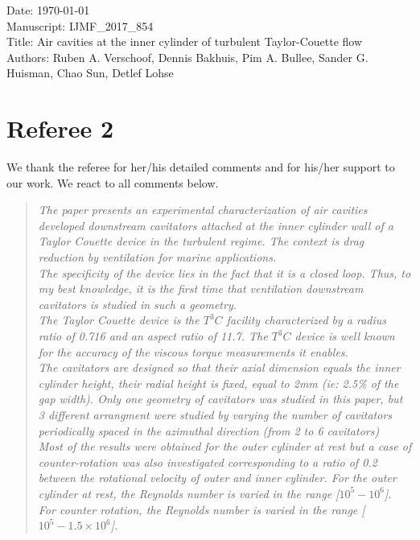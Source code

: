 \documentclass[10pt]{article}
\newcommand{\question}[1]{\begin{quote} \emph{#1}  \end{quote} }
\begin{document}
\noindent Date: \today \\
Manuscript: IJMF\_2017\_854\\
Title: Air cavities at the inner cylinder of turbulent Taylor-Couette flow \\
Authors: Ruben A. Verschoof, Dennis Bakhuis, Pim A. Bullee, Sander G. Huisman, Chao Sun, Detlef Lohse

\vspace*{1.25cm}
\section*{Referee 2}
We thank the referee for her/his detailed comments and for his/her support to our work. We react to all comments below.

\question{The paper presents an experimental characterization of air cavities developed downstream cavitators attached at the inner cylinder wall of a Taylor Couette device in the turbulent regime. The context is drag reduction by ventilation for marine applications. \vspace{\baselineskip}\\
 The specificity of the device lies in the fact that it is a closed loop. Thus, to my best knowledge, it is the first time that ventilation downstream cavitators is studied in such a geometry. \vspace{\baselineskip}\\
The Taylor Couette device is the $T^3C$ facility characterized by a radius ratio of 0.716 and an aspect ratio of 11.7. The $T^3C$ device is well known for the accuracy of the viscous torque measurements it enables. \vspace{\baselineskip}\\
The cavitators are designed so that their axial dimension equals the inner cylinder height, their radial height is fixed, equal to 2mm (ie: 2.5\% of the gap width). Only one geometry of cavitators was studied in this paper, but 3 different arrangment were studied by varying the number of cavitators periodically spaced in the azimuthal direction (from 2 to 6 cavitators) \vspace{\baselineskip}\\
 Most of the results were obtained for the outer cylinder at rest but a case of counter-rotation was also investigated corresponding to a ratio of 0.2 between the rotational velocity of outer and inner cylinder. For the outer cylinder at rest, the Reynolds number is varied in the range [$10^5-10^6$]. For counter rotation, the Reynolds number is varied in the range [$10^5-1.5 \times10^6$]. \vspace{\baselineskip}\\
}
\end{document}
